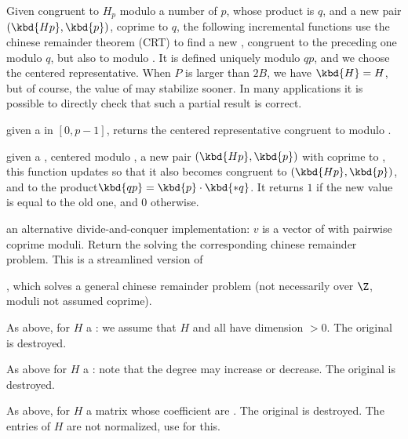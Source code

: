 Given  congruent to $H_p$ modulo a number of $p$, whose product is
$q$, and a new pair $(\kbd{Hp}, \kbd{p})$,  coprime to $q$, the
following incremental functions use the chinese remainder theorem (CRT) to
find a new , congruent to the preceding one modulo $q$, but also to
 modulo . It is defined uniquely modulo $qp$, and we choose
the centered representative. When $P$ is larger than $2B$, we have $\kbd{H} =
H$, but of course, the value of  may stabilize sooner. In many
applications it is possible to directly check that such a partial result is
correct.

 given a   in
$[0, p-1]$, returns the centered representative  congruent to 
modulo .

given a  , centered modulo , a new pair $(\kbd{Hp},
\kbd{p})$ with  coprime to , this function updates  so
that it also becomes congruent to $(\kbd{Hp}, \kbd{p})$, and  to the
product$\kbd{qp} = \kbd{p} \cdot \kbd{*q}$. It returns $1$ if the new value
is equal to the old one, and $0$ otherwise.

 an alternative divide-and-conquer
implementation: $v$ is a vector of  with pairwise coprime moduli.
Return the  solving the corresponding chinese remainder problem.
This is a streamlined version of

, which solves a general chinese remainder problem
(not necessarily over $\Z$, moduli not assumed coprime).

As above, for $H$ a : we assume that $H$ and all  have
dimension $> 0$. The original  is destroyed.



As above for $H$ a : note that the degree may increase or decrease.
The original  is destroyed.



As above, for $H$ a matrix whose coefficient are .
The original  is destroyed.
The entries of $H$ are not normalized, use 
for this.

